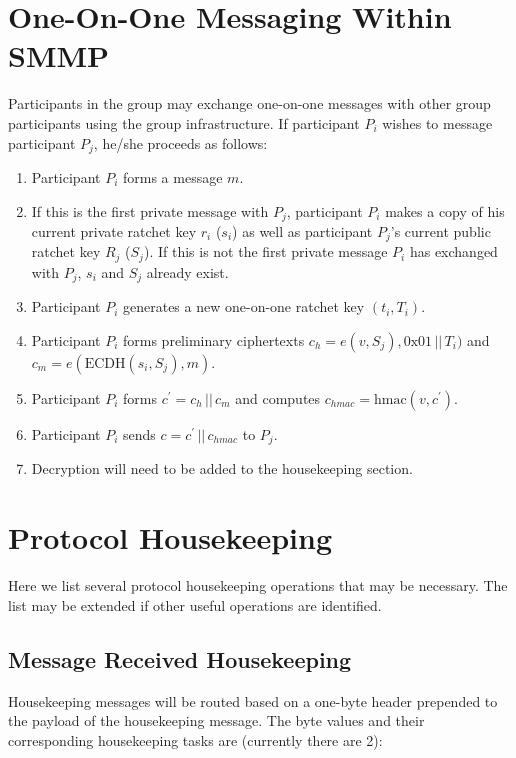 \documentclass[%
preprint,
amsmath,amssymb,
aps,
prb,
floatfix,
]{revtex4-1}
\begin{document}
\section{\label{sec:im}One-On-One Messaging Within SMMP}
Participants in the group may exchange one-on-one messages with other group
participants using the group infrastructure. If participant $P_i$ wishes to
message participant $P_j$, he/she proceeds as follows:
\begin{enumerate}
\item Participant $P_i$ forms a message $m$.
\item If this is the first private message with $P_j$, participant $P_i$ makes
a copy of his current private ratchet key $r_i$
($s_i$) as well as participant $P_j$'s current public ratchet key $R_j$ ($S_j$).
If this is not the first private message $P_i$ has exchanged with $P_j$,
$s_i$ and $S_j$ already exist.
\item Participant $P_i$ generates a new one-on-one ratchet key $(t_i, T_i)$.
\item Participant $P_i$ forms preliminary ciphertexts $c_h = e(v, S_j), 0\mathrm{x}01
\, || \, T_i)$ and $c_m = e(\mathrm{ECDH}(s_i, S_j), m)$.
\item Participant $P_i$ forms $c^\prime = c_h \, || \, c_m$ and computes $c_{hmac} =
\mathrm{hmac}(v, c^\prime)$.
\item Participant $P_i$ sends $c = c^\prime \, || \, c_{hmac}$ to $P_j$.
\item Decryption will need to be added to the housekeeping section.
\end{enumerate}

\section{\label{sec:housekeeping}Protocol Housekeeping}
Here we list several protocol housekeeping operations that may be necessary.
The list may be extended if other useful operations are identified.

\subsection{\label{sec:receivehousekeeping}Message Received Housekeeping}
Housekeeping messages will be routed based on a one-byte header prepended to the
payload of the housekeeping message. The byte values and their corresponding
housekeeping tasks are (currently there are 2): \\
\end{document}
